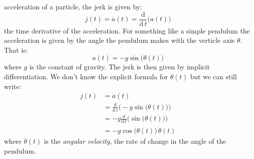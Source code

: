 \documentclass{article}
\theoremstyle{plain}
\begin{document}
    acceleration of a particle, the jerk is given by:
    \begin{equation}
        j(t)=\dot{a}(t)=\frac{\textrm{d}}{\textrm{d}\,t}\big(a(t)\big)
    \end{equation}
    the time derivative of the acceleration. For something like a simple
    pendulum the acceleration is given by the angle the pendulum makes with
    the verticle axis $\theta$. That is:
    \begin{equation}
        a(t)=-g\sin\big(\theta(t)\big)
    \end{equation}
    where $g$ is the constant of gravity. The jerk is then given by implicit
    differentiation. We don't know the explicit formula for $\theta(t)$ but
    we can still write:
    \begin{align}
        j(t)
        &=\dot{a}(t)\\
        &=\frac{\textrm{d}}{\textrm{d}\,t}\Big(-g\sin\big(\theta(t)\big)\Big)\\
        &=-g\frac{\textrm{d}}{\textrm{d}\,t}\Big(\sin\big(\theta(t)\big)\Big)\\
        &=-g\cos\big(\theta(t)\big)\,\dot{\theta}(t)
    \end{align}
    where $\dot{\theta}(t)$ is the \textit{angular velocity}, the rate of
    change in the angle of the pendulum.
\end{document}
